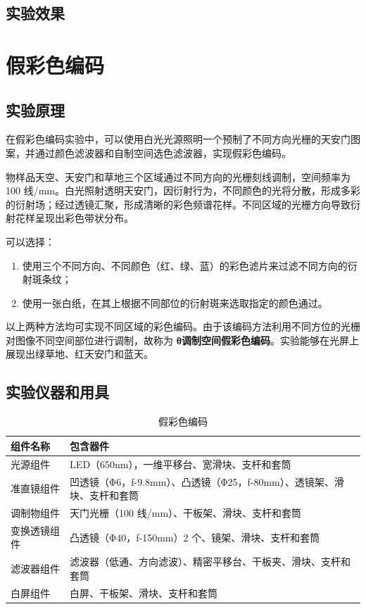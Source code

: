 \documentclass[zihao=5, UTF8]{article}
\theoremstyle{MyLineTheoremStyle} %
\theoremstyle{MyBlockTheoremStyle} %
\theoremstyle{MySubsubsectionStyle} %
\begin{document}
\subsection{实验效果}



\section{假彩色编码}

\subsection{实验原理}

在假彩色编码实验中，可以使用白光光源照明一个预制了不同方向光栅的天安门图案，并通过颜色滤波器和自制空间选色滤波器，实现假彩色编码。

物样品天空、天安门和草地三个区域通过不同方向的光栅刻线调制，空间频率为 100 线/mm。白光照射透明天安门，因衍射行为，不同颜色的光将分散，形成多彩的衍射场；经过透镜汇聚，形成清晰的彩色频谱花样。不同区域的光栅方向导致衍射花样呈现出彩色带状分布。

可以选择：
\begin{enumerate}
    \item 使用三个不同方向、不同颜色（红、绿、蓝）的彩色滤片来过滤不同方向的衍射斑条纹；
    \item 使用一张白纸，在其上根据不同部位的衍射斑来选取指定的颜色通过。
\end{enumerate}

以上两种方法均可实现不同区域的彩色编码。由于该编码方法利用不同方位的光栅对图像不同空间部位进行调制，故称为 \textbf{θ调制空间假彩色编码}。实验能够在光屏上展现出绿草地、红天安门和蓝天。


\subsection{实验仪器和用具}

\begin{table}[h]
\centering
\begin{tabular}{|p{3cm}|p{10cm}|}
\hline
\textbf{组件名称} & \textbf{包含器件} \\
\hline
光源组件 & LED（650nm），一维平移台、宽滑块、支杆和套筒 \\
\hline
准直镜组件 & 凹透镜（Φ6，f-9.8mm）、凸透镜（Φ25，f-80mm）、透镜架、滑块、支杆和套筒 \\
\hline
调制物组件 & 天门光栅（100 线/mm）、干板架、滑块、支杆和套筒 \\
\hline
变换透镜组件 & 凸透镜（Φ40，f-150mm）2 个、镜架、滑块、支杆和套筒 \\
\hline
滤波器组件 & 滤波器（低通、方向滤波）、精密平移台、干板夹、滑块、支杆和套筒 \\
\hline
白屏组件 & 白屏、干板架、滑块、支杆和套筒 \\
\hline
\end{tabular}
\caption{假彩色编码}
\label{tab:components}
\end{table}
\end{document}
